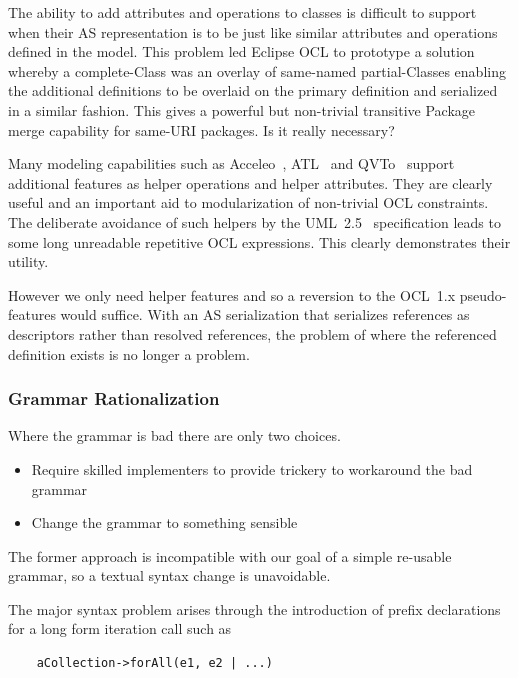 \documentclass{jot}
\begin{document}
The ability to add attributes and operations to classes is difficult to support when their AS representation is to be just like similar attributes and operations defined in the model. This problem led Eclipse OCL to prototype a solution whereby a complete-Class was an overlay of same-named partial-Classes enabling the additional definitions to be overlaid on the primary definition and serialized in a similar fashion. This gives a powerful but non-trivial transitive Package merge capability for same-URI packages. Is it really necessary?

Many modeling capabilities such as Acceleo~\cite{Eclipse-Acceleo}, ATL~\cite{Eclipse-ATL} and QVTo~\cite{Eclipse-QVTo} support additional features as helper operations and helper attributes. They are clearly useful and an important aid to modularization of non-trivial OCL constraints. The deliberate avoidance of such helpers by the UML~2.5~\cite{UML-2.5} specification leads to some long unreadable repetitive OCL expressions. This clearly demonstrates their utility.

However we only need helper features and so a reversion to the OCL~1.x pseudo-features would suffice. With an AS serialization that serializes references as descriptors rather than resolved references, the problem of where the referenced definition exists is no longer a problem.

\subsubsection{Grammar Rationalization}

Where the grammar is bad there are only two choices.

\begin{itemize}
	\item Require skilled implementers to provide trickery to workaround the bad grammar
	\item Change the grammar to something sensible
\end{itemize}

The former approach is incompatible with our goal of a simple re-usable grammar, so a textual syntax change is unavoidable.

The major syntax problem arises through the introduction of prefix declarations for a long form iteration call such as

\begin{verbatim}
    aCollection->forAll(e1, e2 | ...)
\end{verbatim}
\end{document}
